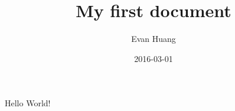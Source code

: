 \documentclass{article}
\title{My first document}
\date{2016-03-01}
\author{Evan Huang}
\begin{document}
	\maketitle
	\newpage

	
	Hello World!
\end{document}
